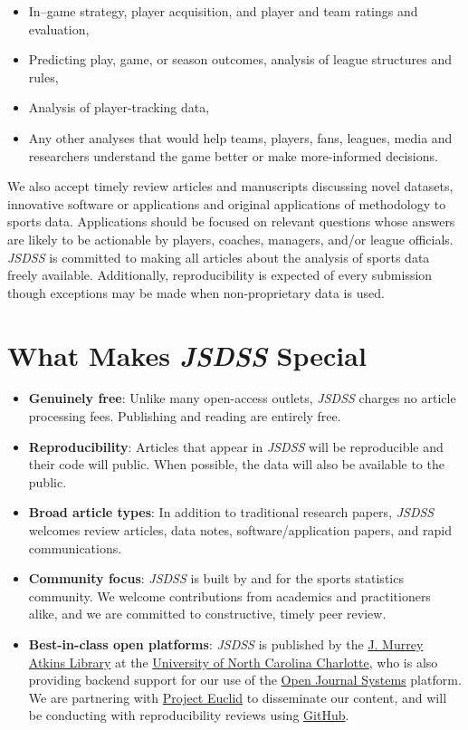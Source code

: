 \documentclass[
  12pt]{article}
\providecommand{\tightlist}{%
  \setlength{\itemsep}{0pt}\setlength{\parskip}{0pt}}
\begin{document}
\begin{itemize}
\tightlist
\item
  In--game strategy, player acquisition, and player and team ratings and
  evaluation,
\item
  Predicting play, game, or season outcomes, analysis of league
  structures and rules,
\item
  Analysis of player-tracking data,
\item
  Any other analyses that would help teams, players, fans, leagues,
  media and researchers understand the game better or make more-informed
  decisions.
\end{itemize}

We also accept timely review articles and manuscripts discussing novel
datasets, innovative software or applications and original applications
of methodology to sports data. Applications should be focused on
relevant questions whose answers are likely to be actionable by players,
coaches, managers, and/or league officials. \emph{JSDSS} is committed to
making all articles about the analysis of sports data freely available.
Additionally, reproducibility is expected of every submission though
exceptions may be made when non-proprietary data is used.

\section{\texorpdfstring{What Makes \emph{JSDSS}
Special}{What Makes JSDSS Special}}\label{what-makes-jsdss-special}

\begin{itemize}
\tightlist
\item
  \textbf{Genuinely free}: Unlike many open-access outlets, \emph{JSDSS}
  charges no article processing fees. Publishing and reading are
  entirely free.
\item
  \textbf{Reproducibility}: Articles that appear in \emph{JSDSS} will be
  reproducible and their code will public. When possible, the data will
  also be available to the public.\\
\item
  \textbf{Broad article types}: In addition to traditional research
  papers, \emph{JSDSS} welcomes review articles, data notes,
  software/application papers, and rapid communications.
\item
  \textbf{Community focus}: \emph{JSDSS} is built by and for the sports
  statistics community. We welcome contributions from academics and
  practitioners alike, and we are committed to constructive, timely peer
  review.
\item
  \textbf{Best-in-class open platforms}: \emph{JSDSS} is published by
  the \href{https://library.charlotte.edu/}{J. Murrey Atkins Library} at
  the \href{https://www.charlotte.edu/}{University of North Carolina
  Charlotte}, who is also providing backend support for our use of the
  \href{https://pkp.sfu.ca/software/ojs/}{Open Journal Systems}
  platform. We are partnering with
  \href{https://projecteuclid.org/}{Project Euclid} to disseminate our
  content, and will be conducting with reproducibility reviews using
  \href{https://github.com/jsds-sports}{GitHub}.
\end{itemize}
\end{document}
